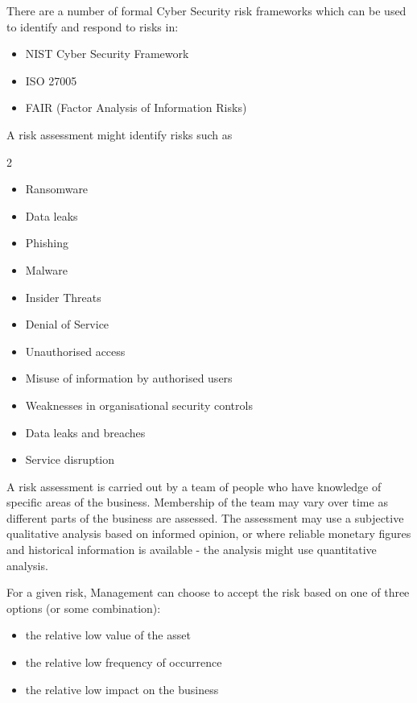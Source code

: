 There are a number of formal Cyber Security risk frameworks which can be used to identify and respond to risks in:
\begin{itemize}
    \item NIST Cyber Security Framework
    \item ISO 27005
    \item FAIR (Factor Analysis of Information Risks)
\end{itemize}

A risk assessment might identify risks such as
\begin{multicols}{2}
    \begin{itemize}
        \item Ransomware
        \item Data leaks
        \item Phishing
        \item Malware
        \item Insider Threats
        \item Denial of Service
        \item Unauthorised access
        \item Misuse of information by authorised users
        \item Weaknesses in organisational security controls
        \item Data leaks and breaches
        \item Service disruption
    \end{itemize}
\end{multicols}

A risk assessment is carried out by a team of people who have knowledge of specific areas of the business. Membership of the team may vary over time as different parts of the business are assessed. The assessment may use a subjective qualitative analysis based on informed opinion, or where reliable monetary figures and historical information is available - the analysis might use quantitative analysis. 

For a given risk, Management can choose to accept the risk based on one of three options (or some combination):
\begin{itemize}
    \item the relative low value of the asset
    \item the relative low frequency of occurrence
    \item the relative low impact on the business
\end{itemize}

